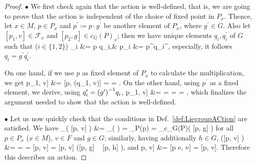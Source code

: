 \documentclass[a4paper,oneside,11pt,bibliography=totoc]{scrartcl}
\def\bas#1\eas{\begin{align*}#1\end{align*}}
\theoremstyle{plain}
\theoremstyle{remark}
\theoremstyle{definition}
\begin{document}
\begin{proof}
\leavevmode\newline
\indent $\bullet$ We first check again that the action is well-defined, that is, we are going to prove that the action is independent of the choice of fixed point in $P_x$.
Thence, let $x \in M$, $p \in P_x$ and $p^\prime \coloneqq p \cdot g^\prime$ be another element of $P_x$, where $g^\prime \in G$. Also let $[p_1,v] \in \mathcal{F}_x$ and $[p_2, g] \in c_G(P)_x$; then we have unique elements $q_i, q_i^\prime$ of $G$ such that ($i \in \{1,2\}$)
\bas
p_i &= p \cdot q_i,&
p_i &= p^\prime \cdot q_i^\prime,
\eas
especially, it follows $q_i = g^\prime q_i^\prime$.

On one hand, if we use $p$ as fixed element of $P_x$ to calculate the multiplication, we get 
\bas
[p_1, v] \cdot [p_2, g]
&=
[p, \Psi(q_1, v)] \cdot [p, c_{q_2}(g)]
=
=
.
\eas
On the other hand, using $p^\prime$ as a fixed element, we derive, using $q_i^\prime = \mleft( g^\prime \mright)^{-1} q_i$,
\bas
[p_1, v] \cdot [p_2, h]
&=
=
=
=
,
\eas
which finalizes the argument needed to show that the action is well-defined.

$\bullet$ Let us now quickly check that the conditions in Def.\ \ref{def:LiegroupACtion} are satisfied. We have
\bas
\pi_{}\bigl( [p, v] \cdot [p, g] \bigr)
&=
\pi_{}\mleft(  \mright)
=
\pi_P(p)
=
\pi_{c_G(P)}\bigl( [p, g] \bigr)
\eas
for all $p \in P_x$ ($x \in M$), $v \in F$ and $g \in G$; similarly, having additionally $h \in G$,
\bas
\bigl([p, v] \cdot [p, g] \bigr) \cdot [p, h]
&=
 \cdot [p, h]
=
=
[p, v] \cdot [p, gh]
=
[p, v] \cdot \bigl([p, g] ~ [p, h] \bigr),
\eas
and
\bas
[p, v] \cdot [p, e]
&=
[p \cdot e, v]
=
[p, v].
\eas
Therefore this describes an action.
\end{proof}
\end{document}
